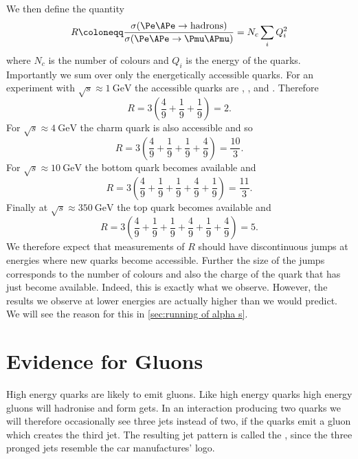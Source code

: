 \documentclass[fleqn]{NotesClass}
\begin{document}
    We then define the quantity
    \begin{equation}
        R \coloneqq \frac{\sigma(\Pe\APe \to \text{hadrons})}{\sigma(\Pe\APe \to \Pmu\APmu)} = N_c\sum_i Q_i^2
    \end{equation}
    where \(N_c\) is the number of colours and \(Q_i\) is the energy of the quarks.
    Importantly we sum over only the energetically accessible quarks.
    For an experiment with \(\sqrt{s} \approx \qty{1}{\giga\electronvolt}\) the accessible quarks are \Pu, \Pd, and \Ps.
    Therefore
    \begin{equation}
        R = 3\left( \frac{4}{9} + \frac{1}{9} + \frac{1}{9} \right) = 2.
    \end{equation}
    For \(\sqrt{s} \approx \qty{4}{\giga\electronvolt}\) the charm quark is also accessible and so
    \begin{equation}
        R = 3\left( \frac{4}{9} + \frac{1}{9} + \frac{1}{9} + \frac{4}{9} \right) = \frac{10}{3}.
    \end{equation}
    For \(\sqrt{s} \approx \qty{10}{\giga\electronvolt}\) the bottom quark becomes available and
    \begin{equation}
        R = 3\left( \frac{4}{9} + \frac{1}{9} + \frac{1}{9} + \frac{4}{9} + \frac{1}{9} \right) = \frac{11}{3}.
    \end{equation}
    Finally at \(\sqrt{s} \approx \qty{350}{\giga\electronvolt}\) the top quark becomes available and
    \begin{equation}
        R = 3\left( \frac{4}{9} + \frac{1}{9} + \frac{1}{9} + \frac{4}{9} + \frac{1}{9} + \frac{4}{9} \right) = 5.
    \end{equation}
    We therefore expect that measurements of \(R\) should have discontinuous jumps at energies where new quarks become accessible.
    Further the size of the jumps corresponds to the number of colours and also the charge of the quark that has just become available.
    Indeed, this is exactly what we observe.
    However, the results we observe at lower energies are actually higher than we would predict.
    We will see the reason for this in \cref{sec:running of alpha s}.
    
    \section{Evidence for Gluons}\label{sec:evidence for gluons}
    High energy quarks are likely to emit gluons.
    Like high energy quarks high energy gluons will hadronise and form gets.
    In an interaction producing two quarks we will therefore occasionally see three jets instead of two, if the quarks emit a gluon which creates the third jet.
    The resulting jet pattern is called the , since the three pronged jets resemble the car manufactures' logo.
    
\end{document}
